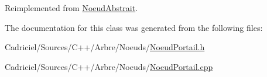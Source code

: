 Reimplemented from \hyperlink{group__inf2990_gadc6ebe69894dbb682fdd0ecb1b6c11e9}{Noeud\-Abstrait}.



The documentation for this class was generated from the following files\-:\begin{DoxyCompactItemize}
\item 
Cadriciel/\-Sources/\-C++/\-Arbre/\-Noeuds/\hyperlink{_noeud_portail_8h}{Noeud\-Portail.\-h}\item 
Cadriciel/\-Sources/\-C++/\-Arbre/\-Noeuds/\hyperlink{_noeud_portail_8cpp}{Noeud\-Portail.\-cpp}\end{DoxyCompactItemize}
